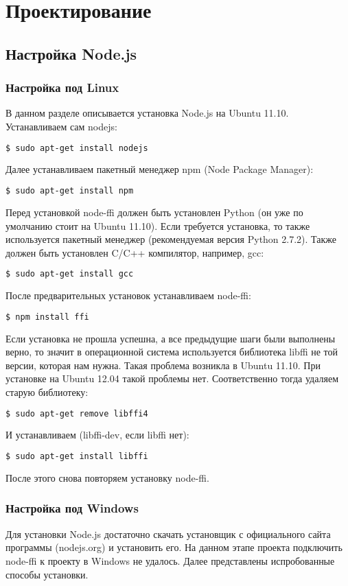 \chapter{Проектирование}
\section{Настройка Node.js}
\subsection{Настройка под Linux}\label{OnLinuxInstall}
В данном разделе описывается установка Node.js на Ubuntu 11.10.
Устанавливаем сам nodejs:
\begin{lstlisting}[numbers=none, language=bash]
	$ sudo apt-get install nodejs
\end{lstlisting}
Далее устанавливаем пакетный менеджер npm (Node Package Manager):
\begin{lstlisting}[numbers=none, language=bash]
	$ sudo apt-get install npm
\end{lstlisting}
Перед установкой node-ffi должен быть установлен Python (он уже по умолчанию стоит на Ubuntu 11.10). Если требуется установка, то также используется пакетный менеджер (рекомендуемая версия Python 2.7.2).
Также должен быть установлен C/C++ компилятор, например, gcc:
\begin{lstlisting}[numbers=none, language=bash]
	$ sudo apt-get install gcc
\end{lstlisting}
После предварительных установок устанавливаем node-ffi:
\begin{lstlisting}[numbers=none, language=bash]
	$ npm install ffi
\end{lstlisting}
Если установка не прошла успешна, а все предыдущие шаги были выполнены верно, то значит в операционной система используется библиотека libffi не той версии, которая нам нужна. Такая проблема возникла в Ubuntu 11.10. При установке на Ubuntu 12.04 такой проблемы нет. Соответственно тогда удаляем старую библиотеку:
\begin{lstlisting}[numbers=none, language=bash]
	$ sudo apt-get remove libffi4
\end{lstlisting}
И устанавливаем  (libffi-dev, если libffi нет):
\begin{lstlisting}[numbers=none, language=bash]
	$ sudo apt-get install libffi
\end{lstlisting}
После этого снова повторяем установку node-ffi.
\subsection{Настройка под Windows}\label{windowsInstall}
Для установки Node.js достаточно скачать установщик с официального сайта программы (nodejs.org) и установить его. На данном этапе проекта подключить node-ffi к проекту в Windows не удалось. 
Далее представлены испробованные способы установки.
